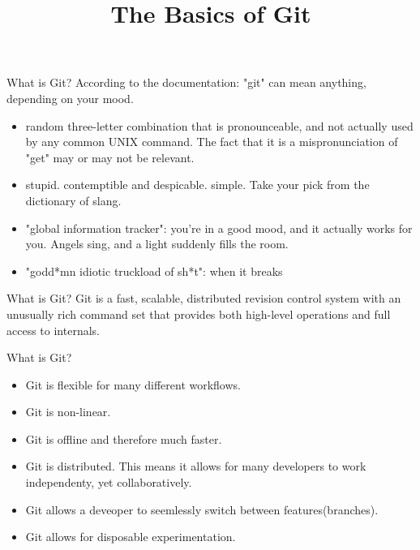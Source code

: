 \documentclass[14pt]{beamer}
\title{The Basics of Git}
\begin{document}
\begin{frame}
\titlepage
\end{frame}

\begin{frame}{What is Git?}
	According to the documentation:\newline
	"git" can mean anything, depending on your mood.
	\begin{itemize}
		\small
		\item random three-letter combination that is pronounceable, and not
		   actually used by any common UNIX command.  The fact that it is a
		   mispronunciation of "get" may or may not be relevant.
		\item stupid. contemptible and despicable. simple. Take your pick from the
		   dictionary of slang.
		\item "global information tracker": you're in a good mood, and it actually
		   works for you. Angels sing, and a light suddenly fills the room.
		\item "godd*mn idiotic truckload of sh*t": when it breaks
	\end{itemize}
\end{frame}

\begin{frame}{What is Git?}
	Git is a fast, scalable, distributed revision control system with an
	unusually rich command set that provides both high-level operations
	and full access to internals.
\end{frame}

\begin{frame}{What is Git?}
	\begin{itemize}
		\item Git is flexible for many different workflows.
		\item Git is non-linear.
		\item Git is offline and therefore much faster.
		\item Git is distributed.  This means it allows for many
			developers to work independenty, yet collaboratively.
		\item Git allows a deveoper to seemlessly switch between features(branches).
		\item Git allows for disposable experimentation.
	\end{itemize}
\end{frame}
\end{document}
